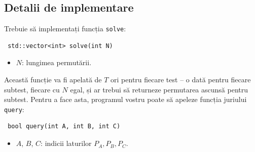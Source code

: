 \documentclass[12pt]{article}
\begin{document}
\subsection{Detalii de implementare}
Trebuie să implementați funcția \texttt{solve}:


\begin{lstlisting}
 std::vector<int> solve(int N)
\end{lstlisting}
\begin{itemize}
	\item $N$: lungimea permutării.
\end{itemize}

Această funcție va fi apelată de $T$ ori pentru fiecare test -- o dată pentru fiecare subtest, fiecare cu $N$ egal, și ar trebui să returneze permutarea ascunsă pentru subtest. Pentru a face asta, programul vostru poate să apeleze funcția juriului \texttt{query}:


\begin{lstlisting}
 bool query(int A, int B, int C)
\end{lstlisting}
\begin{itemize}
	\item $A$, $B$, $C$: indicii laturilor $P_A, P_B, P_C$.
\end{itemize}
\end{document}
